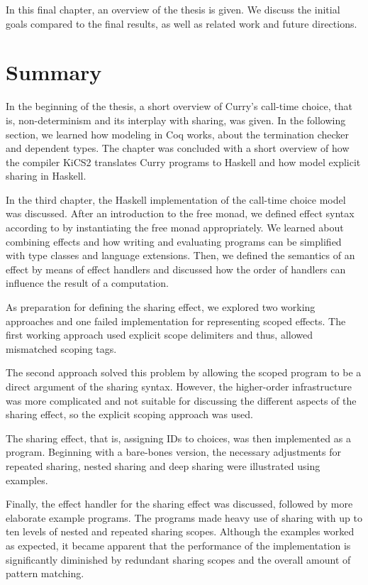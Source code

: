 \documentclass[a4paper, 11pt, fleqn, twoside]{scrreprt}
\begin{document}
In this final chapter, an overview of the thesis is given.
We discuss the initial goals compared to the final results, as well as related work and future directions.

\section{Summary}

In the beginning of the thesis, a short overview of Curry's call-time choice, that is, non-determinism and its interplay with sharing, was given.
In the following section, we learned how modeling in Coq works, about the termination checker and dependent types.
The chapter was concluded with a short overview of how the compiler KiCS2 translates Curry programs to Haskell and how \citet{fischer2009purely} model explicit sharing in Haskell.

In the third chapter, the Haskell implementation of the call-time choice model was discussed.
After an introduction to the free monad, we defined effect syntax according to \citet{wu2014effect} by instantiating the free monad appropriately.
We learned about combining effects and how writing and evaluating programs can be simplified with type classes and language extensions.
Then, we defined the semantics of an effect by means of effect handlers and discussed how the order of handlers can influence the result of a computation.

As preparation for defining the sharing effect, we explored two working approaches and one failed implementation for representing scoped effects.
The first working approach used explicit scope delimiters and thus, allowed mismatched scoping tags.

The second approach solved this problem by allowing the scoped program to be a direct argument of the sharing syntax.
However, the higher-order infrastructure was more complicated and not suitable for discussing the different aspects of the sharing effect, so the explicit scoping approach was used.

The sharing effect, that is, assigning IDs to choices, was then implemented as a program.
Beginning with a bare-bones version, the necessary adjustments for repeated sharing, nested sharing and deep sharing were illustrated using examples.

Finally, the effect handler for the sharing effect was discussed, followed by more elaborate example programs.
The programs made heavy use of sharing with up to ten levels of nested and repeated sharing scopes.
Although the examples worked as expected, it became apparent that the performance of the implementation is significantly diminished by redundant sharing scopes and the overall amount of pattern matching.
\end{document}
